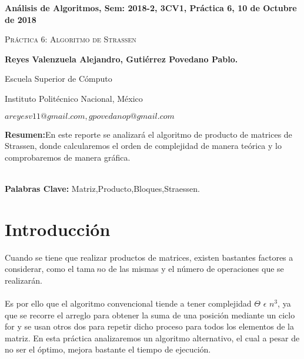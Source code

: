 \documentclass[12pt,twoside]{article}
\date{}
\begin{document}
\centerline{\bf An\'alisis de Algoritmos, Sem: 2018-2, 3CV1, Pr\'actica 6, 10 de Octubre de 2018}
\centerline{}
\centerline{}
\begin{center}
\Large{\textsc{Pr\'actica 6: Algoritmo de Strassen}}
\end{center}
\centerline{}
\centerline{\bf {Reyes Valenzuela Alejandro, Guti\'errez Povedano Pablo.}}
\centerline{}
\centerline{Escuela Superior de C\'omputo}
\centerline{Instituto Polit\'ecnico Nacional, M\'exico}
\centerline{$areyesv11@gmail.com, gpovedanop@gmail.com$}
\newtheorem{Theorem}{\quad Theorem}[section]
\newtheorem{Definition}[Theorem]{\quad Definition}
\newtheorem{Corollary}[Theorem]{\quad Corollary}
\newtheorem{Lemma}[Theorem]{\quad Lemma}
\newtheorem{Example}[Theorem]{\quad Example}
\bigskip
\textbf{Resumen:}En este reporte se analizar\'a el algoritmo de producto de matrices de Strassen, donde calcularemos el orden de complejidad de manera te\'orica y lo comprobaremos de manera gr\'afica.\\\\
\centerline{{\bf Palabras Clave:}  Matriz,Producto,Bloques,Straessen.}
\section{Introducci\'on}
Cuando se tiene que realizar productos de matrices, existen bastantes factores a considerar, como el tama$~n$o de las mismas y el n\'umero de operaciones que se realizar\'an. \\\\
Es por ello que el algoritmo convencional tiende a tener complejidad $\Theta$ $\epsilon$ $n^{3}$, ya que se recorre el arreglo para obtener la suma de una posici\'on mediante un ciclo for y se usan otros dos para repetir dicho proceso para todos los elementos de la matriz. En esta pr\'actica analizaremos un algoritmo alternativo, el cual a pesar de no ser el \'optimo, mejora bastante el tiempo de ejecuci\'on.
\end{document}

